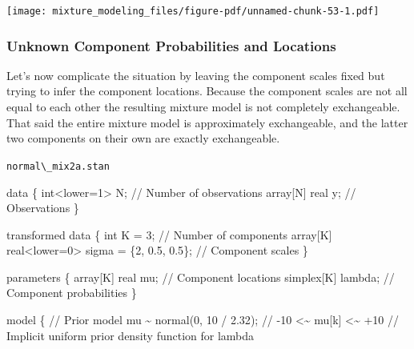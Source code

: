 \documentclass[
  letterpaper,
  DIV=11,
  numbers=noendperiod]{scrartcl}
\newenvironment{Shaded}{\begin{snugshade}}{\end{snugshade}}
\newcommand{\CommentTok}[1]{\textcolor[rgb]{0.37,0.37,0.37}{#1}}
\newcommand{\DataTypeTok}[1]{\textcolor[rgb]{0.68,0.00,0.00}{#1}}
\newcommand{\DecValTok}[1]{\textcolor[rgb]{0.68,0.00,0.00}{#1}}
\newcommand{\FloatTok}[1]{\textcolor[rgb]{0.68,0.00,0.00}{#1}}
\newcommand{\KeywordTok}[1]{\textcolor[rgb]{0.00,0.23,0.31}{#1}}
\newcommand{\NormalTok}[1]{\textcolor[rgb]{0.00,0.23,0.31}{#1}}
\begin{document}
\texttt{[image: mixture\_modeling\_files/figure-pdf/unnamed-chunk-53-1.pdf]}

\subsubsection{Unknown Component Probabilities and
Locations}\label{unknown-component-probabilities-and-locations}

Let's now complicate the situation by leaving the component scales fixed
but trying to infer the component locations. Because the component
scales are not all equal to each other the resulting mixture model is
not completely exchangeable. That said the entire mixture model is
approximately exchangeable, and the latter two components on their own
are exactly exchangeable.

\begin{codelisting}

\caption{\texttt{normal\textbackslash\_mix2a.stan}}

\begin{Shaded}
\begin{Highlighting}[]
\KeywordTok{data}\NormalTok{ \{}
  \DataTypeTok{int}\NormalTok{\textless{}}\KeywordTok{lower}\NormalTok{=}\DecValTok{1}\NormalTok{\textgreater{} N;  }\CommentTok{// Number of observations}
  \DataTypeTok{array}\NormalTok{[N] }\DataTypeTok{real}\NormalTok{ y; }\CommentTok{// Observations}
\NormalTok{\}}

\KeywordTok{transformed data}\NormalTok{ \{}
  \DataTypeTok{int}\NormalTok{ K = }\DecValTok{3}\NormalTok{;                                    }\CommentTok{// Number of components}
  \DataTypeTok{array}\NormalTok{[K] }\DataTypeTok{real}\NormalTok{\textless{}}\KeywordTok{lower}\NormalTok{=}\DecValTok{0}\NormalTok{\textgreater{} sigma = \{}\DecValTok{2}\NormalTok{, }\FloatTok{0.5}\NormalTok{, }\FloatTok{0.5}\NormalTok{\}; }\CommentTok{// Component scales}
\NormalTok{\}}

\KeywordTok{parameters}\NormalTok{ \{}
  \DataTypeTok{array}\NormalTok{[K] }\DataTypeTok{real}\NormalTok{ mu;  }\CommentTok{// Component locations}
  \DataTypeTok{simplex}\NormalTok{[K] lambda; }\CommentTok{// Component probabilities}
\NormalTok{\}}

\KeywordTok{model}\NormalTok{ \{}
  \CommentTok{// Prior model}
\NormalTok{  mu \textasciitilde{} normal(}\DecValTok{0}\NormalTok{, }\DecValTok{10}\NormalTok{ / }\FloatTok{2.32}\NormalTok{); }\CommentTok{// {-}10 \textless{}\textasciitilde{} mu[k] \textless{}\textasciitilde{} +10}
  \CommentTok{// Implicit uniform prior density function for lambda}


\end{Highlighting}
\end{Shaded}
\end{codelisting}
\end{document}
